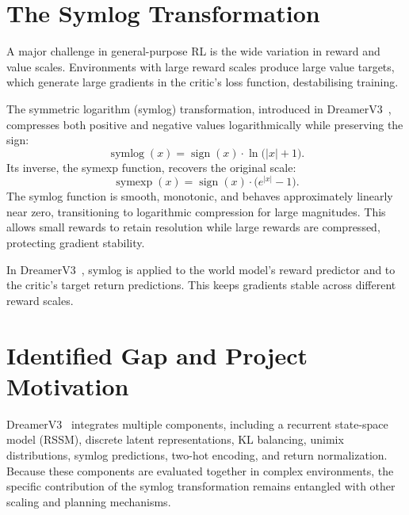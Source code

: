 \section{The Symlog Transformation}
\label{sec:lit_symlog}

A major challenge in general-purpose RL is the wide variation in reward and value scales. Environments with large reward scales produce large value targets, which generate large gradients in the critic's loss function, destabilising training.

The symmetric logarithm (symlog) transformation, introduced in DreamerV3~\citep{hafner2023dreamerv3}, compresses both positive and negative values logarithmically while preserving the sign:
\begin{equation}
    \operatorname{symlog}(x) = \operatorname{sign}(x) \cdot \ln\bigl(|x| + 1\bigr).
    \label{eq:symlog}
\end{equation}
Its inverse, the symexp function, recovers the original scale:
\begin{equation}
    \operatorname{symexp}(x) = \operatorname{sign}(x) \cdot \bigl(e^{|x|} - 1\bigr).
    \label{eq:symexp}
\end{equation}
The symlog function is smooth, monotonic, and behaves approximately linearly near zero, transitioning to logarithmic compression for large magnitudes. This allows small rewards to retain resolution while large rewards are compressed, protecting gradient stability.

In DreamerV3~\citep{hafner2023dreamerv3}, symlog is applied to the world model's reward predictor and to the critic's target return predictions. This keeps gradients stable across different reward scales.

\section{Identified Gap and Project Motivation}
\label{sec:lit_gap}

DreamerV3~\citep{hafner2023dreamerv3} integrates multiple components, including a recurrent state-space model (RSSM), discrete latent representations, KL balancing, unimix distributions, symlog predictions, two-hot encoding, and return normalization. Because these components are evaluated together in complex environments, the specific contribution of the symlog transformation remains entangled with other scaling and planning mechanisms.

